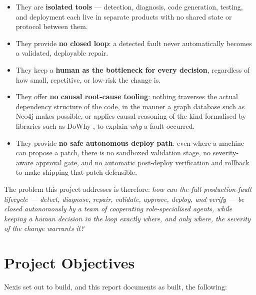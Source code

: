 \begin{itemize}
  \item They are \textbf{isolated tools} --- detection, diagnosis, code
    generation, testing, and deployment each live in separate products with
    no shared state or protocol between them.
  \item They provide \textbf{no closed loop}: a detected fault never
    automatically becomes a validated, deployable repair.
  \item They keep a \textbf{human as the bottleneck for every decision},
    regardless of how small, repetitive, or low-risk the change is.
  \item They offer \textbf{no causal root-cause tooling}: nothing traverses
    the actual dependency structure of the code, in the manner a graph
    database such as Neo4j \cite{neo4j} makes possible, or applies causal
    reasoning of the kind formalised by libraries such as DoWhy
    \cite{dowhy}, to explain \emph{why} a fault occurred.
  \item They provide \textbf{no safe autonomous deploy path}: even where a
    machine can propose a patch, there is no sandboxed validation stage, no
    severity-aware approval gate, and no automatic post-deploy verification
    and rollback to make shipping that patch defensible.
\end{itemize}

The problem this project addresses is therefore: \emph{how can the full
production-fault lifecycle --- detect, diagnose, repair, validate, approve,
deploy, and verify --- be closed autonomously by a team of cooperating
role-specialised agents, while keeping a human decision in the loop exactly
where, and only where, the severity of the change warrants it?}

\section{Project Objectives}

Nexis set out to build, and this report documents as built, the following:

